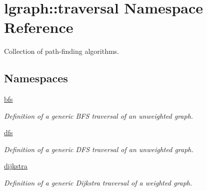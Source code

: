 \hypertarget{namespacelgraph_1_1traversal}{}\section{lgraph\+:\+:traversal Namespace Reference}
\label{namespacelgraph_1_1traversal}


Collection of path-\/finding algorithms.  


\subsection*{Namespaces}
\begin{DoxyCompactItemize}
\item 
 \hyperlink{namespacelgraph_1_1traversal_1_1bfs}{bfs}
\begin{DoxyCompactList}\small\item\em Definition of a generic B\+FS traversal of an unweighted graph. \end{DoxyCompactList}\item 
 \hyperlink{namespacelgraph_1_1traversal_1_1dfs}{dfs}
\begin{DoxyCompactList}\small\item\em Definition of a generic D\+FS traversal of an unweighted graph. \end{DoxyCompactList}\item 
 \hyperlink{namespacelgraph_1_1traversal_1_1dijkstra}{dijkstra}
\begin{DoxyCompactList}\small\item\em Definition of a generic Dijkstra traversal of a weighted graph. \end{DoxyCompactList}\end{DoxyCompactItemize}
